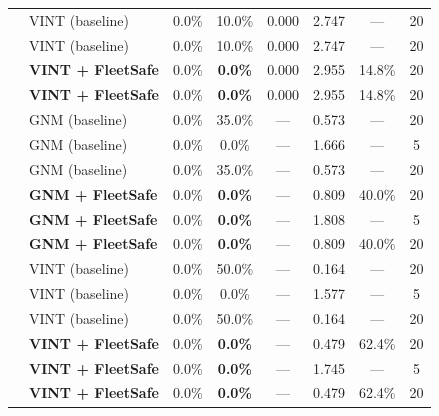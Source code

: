 \begin{table}[t]
{\begin{tabular}{llcccccc}
 & VINT (baseline) & 0.0\% & 10.0\% & 0.000 & 2.747 & — & 20 \\
 & VINT (baseline) & 0.0\% & 10.0\% & 0.000 & 2.747 & — & 20 \\
 & \textbf{VINT + FleetSafe} & 0.0\% & \textbf{\textcolor{ProvenGreen}{0.0\%}} & 0.000 & 2.955 & 14.8\% & 20 \\
 & \textbf{VINT + FleetSafe} & 0.0\% & \textbf{\textcolor{ProvenGreen}{0.0\%}} & 0.000 & 2.955 & 14.8\% & 20 \\
\midrule
 & GNM (baseline) & 0.0\% & 35.0\% & — & 0.573 & — & 20 \\
 & GNM (baseline) & 0.0\% & 0.0\% & — & 1.666 & — & 5 \\
 & GNM (baseline) & 0.0\% & 35.0\% & — & 0.573 & — & 20 \\
 & \textbf{GNM + FleetSafe} & 0.0\% & \textbf{\textcolor{ProvenGreen}{0.0\%}} & — & 0.809 & 40.0\% & 20 \\
 & \textbf{GNM + FleetSafe} & 0.0\% & \textbf{\textcolor{ProvenGreen}{0.0\%}} & — & 1.808 & — & 5 \\
 & \textbf{GNM + FleetSafe} & 0.0\% & \textbf{\textcolor{ProvenGreen}{0.0\%}} & — & 0.809 & 40.0\% & 20 \\
 & VINT (baseline) & 0.0\% & 50.0\% & — & 0.164 & — & 20 \\
 & VINT (baseline) & 0.0\% & 0.0\% & — & 1.577 & — & 5 \\
 & VINT (baseline) & 0.0\% & 50.0\% & — & 0.164 & — & 20 \\
 & \textbf{VINT + FleetSafe} & 0.0\% & \textbf{\textcolor{ProvenGreen}{0.0\%}} & — & 0.479 & 62.4\% & 20 \\
 & \textbf{VINT + FleetSafe} & 0.0\% & \textbf{\textcolor{ProvenGreen}{0.0\%}} & — & 1.745 & — & 5 \\
 & \textbf{VINT + FleetSafe} & 0.0\% & \textbf{\textcolor{ProvenGreen}{0.0\%}} & — & 0.479 & 62.4\% & 20 \\
\bottomrule
\end{tabular}
}
\end{table}
